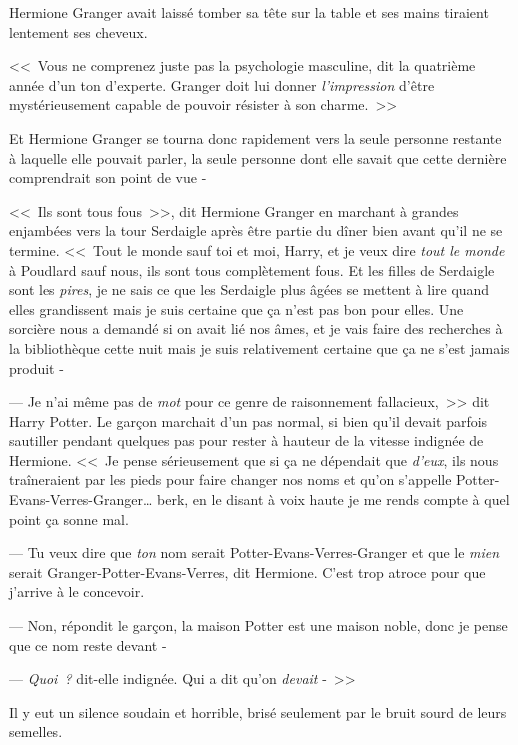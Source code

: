 Hermione Granger avait laissé tomber sa tête sur la table et ses mains tiraient lentement ses cheveux.

<<~Vous ne comprenez juste pas la psychologie masculine, dit la quatrième année d'un ton d'experte. Granger doit lui donner \emph{l'impression} d'être mystérieusement capable de pouvoir résister à son charme.~>>


Et Hermione Granger se tourna donc rapidement vers la seule personne restante à laquelle elle pouvait parler, la seule personne dont elle savait que cette dernière comprendrait son point de vue -

<<~Ils sont tous fous~>>, dit Hermione Granger en marchant à grandes enjambées vers la tour Serdaigle après être partie du dîner bien avant qu'il ne se termine. <<~Tout le monde sauf toi et moi, Harry, et je veux dire \emph{tout le monde} à Poudlard sauf nous, ils sont tous complètement fous. Et les filles de Serdaigle sont les \emph{pires}, je ne sais ce que les Serdaigle plus âgées se mettent à lire quand elles grandissent mais je suis certaine que ça n'est pas bon pour elles. Une sorcière nous a demandé si on avait lié nos âmes, et je vais faire des recherches à la bibliothèque cette nuit mais je suis relativement certaine que ça ne s'est jamais produit -

--- Je n'ai même pas de \emph{mot} pour ce genre de raisonnement fallacieux,~>> dit Harry Potter. Le garçon marchait d'un pas normal, si bien qu'il devait parfois sautiller pendant quelques pas pour rester à hauteur de la vitesse indignée de Hermione. <<~Je pense sérieusement que si ça ne dépendait que \emph{d'eux}, ils nous traîneraient par les pieds pour faire changer nos noms et qu'on s'appelle Potter-Evans-Verres-Granger… berk, en le disant à voix haute je me rends compte à quel point ça sonne mal.

--- Tu veux dire que \emph{ton} nom serait Potter-Evans-Verres-Granger et que le \emph{mien} serait Granger-Potter-Evans-Verres, dit Hermione. C'est trop atroce pour que j'arrive à le concevoir.

--- Non, répondit le garçon, la maison Potter est une maison noble, donc je pense que ce nom reste devant -

--- \emph{Quoi~?} dit-elle indignée. Qui a dit qu'on \emph{devait} -~>>

Il y eut un silence soudain et horrible, brisé seulement par le bruit sourd de leurs semelles.

